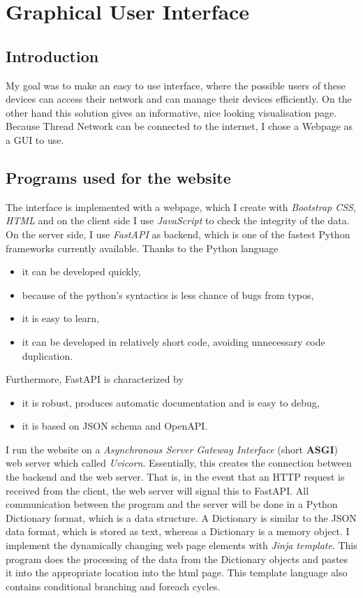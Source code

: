 
\section{Graphical User Interface}

\subsection{Introduction}
My goal was to make an easy to use interface, where the possible users of these devices can access their network and can manage their devices efficiently. On the other hand this solution gives an informative, nice looking visualisation page. Because Thread Network can be connected to the internet, I chose a Webpage as a GUI to use.

\subsection{Programs used for the website}
The interface is implemented with a webpage, which I create with \textit{Bootstrap CSS}, \textit{HTML} and on the client side I use \textit{JavaScript} to check the integrity of the data. On the server side, I use \textit{FastAPI} as backend, which is one of the fastest Python frameworks currently available. Thanks to the Python language
\begin{itemize}
    \item it can be developed quickly, 
    \item because of the python's syntactics is less chance of bugs from typos,
    \item it is easy to learn,
    \item it can be developed in relatively short code, avoiding unnecessary code duplication.
\end{itemize}
\clearpage
\noindent
Furthermore, FastAPI is characterized by
\begin{itemize}
    \item it is robust, produces automatic documentation and is easy to debug,
    \item it is based on JSON schema and OpenAPI.
\end{itemize}
I run the website on a \textit{Asynchronous Server Gateway Interface} (short \textbf{ASGI}) web server which called \textit{Uvicorn}. Essentially, this creates the connection between the backend and the web server. That is, in the event that an HTTP request is received from the client, the web server will signal this to FastAPI. All communication between the program and the server will be done in a Python Dictionary format, which is a data structure. A Dictionary is similar to the JSON data format, which is stored as text, whereas a Dictionary is a memory object.
I implement the dynamically changing web page elements with \textit{Jinja template}. This program does the processing of the data from the Dictionary objects and pastes it into the appropriate location into the html page. This template language also contains conditional branching and foreach cycles.


